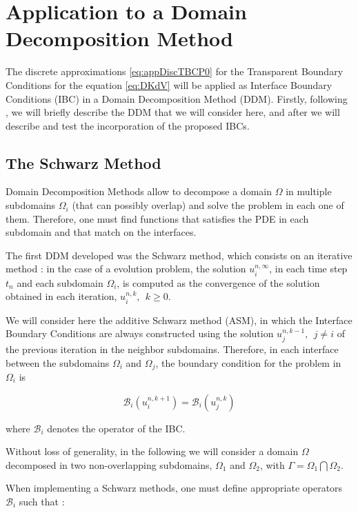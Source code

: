 \section{Application to a Domain Decomposition Method}
\label{sec:DDM}

\indent The discrete approximations \eqref{eq:appDiscTBCP0} for the Transparent Boundary Conditions for the equation \eqref{eq:DKdV} will be applied as Interface Boundary Conditions (IBC) in a Domain Decomposition Method (DDM). Firstly, following \cite{Japhet2003}, we will briefly describe the DDM that we will consider here, and after we will describe and test the incorporation of the proposed IBCs.

\subsection{The Schwarz Method}

\indent Domain Decomposition Methods allow to decompose a domain $\Omega$ in multiple subdomains $\Omega_i$ (that can possibly overlap) and solve the problem in each one of them. Therefore, one must find functions that satisfies the PDE in each subdomain and that match on the interfaces. 

\indent The first DDM developed was the Schwarz method, which consists on an iterative method : in the case of a evolution problem, the solution  $u_i^{n,\infty}$, in each time step $t_n$ and each subdomain $\Omega_i$, is computed as the convergence of the solution obtained in each iteration, $u_i^{n,k}, \ \ k\geq 0$. 

\indent We will consider here the additive Schwarz method (ASM), in which the Interface Boundary Conditions are always constructed using the solution $u_j^{n,k-1}, \ \ j \neq i$ of the previous iteration in the neighbor subdomains. Therefore, in each interface between the subdomains $\Omega_i$ and $\Omega_j$, the boundary condition for the problem in $\Omega_i$ is

$$\mathcal{B}_i(u_i^{n,k+1}) = \mathcal{B}_i(u_j^{n,k})$$

\noindent where $\mathcal{B}_i$ denotes the operator of the IBC.

\indent Without loss of generality, in the following we will consider a domain $\Omega$ decomposed in two non-overlapping subdomains, $\Omega_1$ and $\Omega_2$, with $\Gamma = \Omega_1 \bigcap \Omega_2$.

\indent When implementing a Schwarz methods, one must define appropriate operators $\mathcal{B}_i$ such that :

